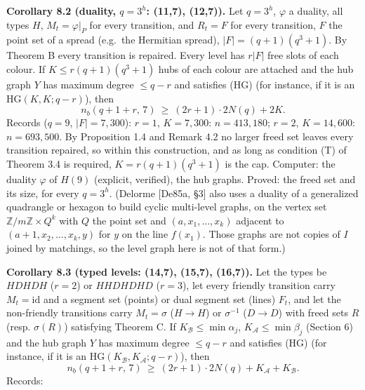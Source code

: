 \documentclass[
  11pt,
]{article}
\begin{document}
\textbf{Corollary 8.2 (duality, \(q = 3^h\): (11,7), (12,7)).} Let \(q = 3^h\), \(\varphi\) a duality, all types \(H\),
\(M_t = \varphi\vert_P\) for every transition, and \(R_t = F\) for every transition, \(F\) the point set of a spread
(e.g.~the Hermitian spread), \(\lvert F\rvert = (q+1)(q^3+1)\). By Theorem B every transition is repaired. Every level
has \(r\lvert F\rvert\) free slots of each colour. If \(K\le r(q+1)(q^3+1)\) hubs of each colour are attached and the
hub graph \(Y\) has maximum degree \(\le q-r\) and satisfies (HG) (for instance, if it is an \(\mathrm{HG}(K,K;q-r)\)),
then \[n_b(q+1+r,\,7)\ \ge\ (2r+1)\cdot 2N(q) + 2K .\] Records (\(q = 9\), \(\lvert F\rvert = 7{,}300\)): \(r = 1\),
\(K = 7{,}300\): \(n = 413{,}180\); \(r = 2\), \(K = 14{,}600\): \(n = 693{,}500\). By Proposition 1.4 and Remark 4.2 no
larger freed set leaves every transition repaired, so within this construction, and as long as condition (T) of Theorem
3.4 is required, \(K = r(q+1)(q^3+1)\) is the cap. Computer: the duality \(\varphi\) of \(H(9)\) (explicit, verified),
the hub graphs. Proved: the freed set and its size, for every \(q = 3^h\). (Delorme {[}De85a, §3{]} also uses a duality
of a generalized quadrangle or hexagon to build cyclic multi-level graphs, on the vertex set
\(\mathbb Z/m\mathbb Z\times Q^k\) with \(Q\) the point set and \((a,x_1,\dots,x_k)\) adjacent to
\((a+1,x_2,\dots,x_k,y)\) for \(y\) on the line \(f(x_1)\). Those graphs are not copies of \(I\) joined by matchings, so
the level graph here is not of that form.)

\textbf{Corollary 8.3 (typed levels: (14,7), (15,7), (16,7)).} Let the types be \(HDHDH\) (\(r = 2\)) or \(HHDHDHD\)
(\(r = 3\)), let every friendly transition carry \(M_t = \mathrm{id}\) and a segment set (points) or dual segment set
(lines) \(F_t\), and let the non-friendly transitions carry \(M_t = \sigma\) (\(H\to H\)) or \(\sigma^{-1}\)
(\(D\to D\)) with freed sets \(R\) (resp. \(\sigma(R)\)) satisfying Theorem C. If \(K_{\mathcal B}\le\min\alpha_j\),
\(K_{\mathcal A}\le\min\beta_j\) (Section 6) and the hub graph \(Y\) has maximum degree \(\le q-r\) and satisfies (HG)
(for instance, if it is an \(\mathrm{HG}(K_{\mathcal B},K_{\mathcal A};q-r)\)), then
\[n_b(q+1+r,\,7)\ \ge\ (2r+1)\cdot 2N(q) + K_{\mathcal A} + K_{\mathcal B}.\] Records:
\end{document}
